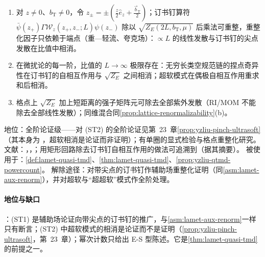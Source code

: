 \begin{assumption}\label{asm:lamet-staple}
\begin{enumerate}[label=(ST\arabic*),leftmargin=3.2em,itemsep=1pt,topsep=2pt]
\item 对 $z\neq0$、$b_{\mathrm T}\neq0$，令 $z_\pm=\pm(\frac z2\hat e_z+\frac{\vec b_{\mathrm T}}2)$；订书钉算符 $\bar\psi(z_+)\Gamma\mathcal W_z(z_+,z_-;L)\psi(z_-)$ 除以 $\sqrt{Z_E(2L,b_{\mathrm T},\mu)}$ 后乘法可重整，重整化因子只依赖于端点（重—轻流、夸克场）：$\propto L$ 的线性发散与订书钉的尖点发散在比值中相消。
\item 在微扰论的每一阶，比值的 $L\to\infty$ 极限存在：无穷长类空规范链的捏点奇异性在订书钉的自相互作用与 $\sqrt{Z_E}$ 之间相消；超软模式在偶极自相互作用重求和后相消。
\item 格点上 $\sqrt{Z_E}$ 加上短距离的强子矩阵元可除去全部紫外发散（RI/MOM 不能除去全部线性发散）；同维混合同\cref{prop:lattice-renormalizability}(b)。
\end{enumerate}
地位：全阶论证级——对 (ST2) 的全阶论证见第~23~章\cref{prop:yzliu-pinch-ultrasoft}（其本身为 \tagA，超软相消是论证而非证明）；有单圈的显式检验与格点重整化研究。
文献：\cite{Ji:2019ewn}，\cite[第~3--4~节]{Liu:2022nnk}，\cite{Ebert:2022fmh,Ebert:2019tvc,Constantinou:2019vyb,Alexandrou:2023ucc}；用矩形回路除去订书钉自相互作用的做法可追溯到\cite{Collins:2008ht,Ji:2018hvs}（据其摘要）。
被使用于：\cref{def:lamet-quasi-tmd}、\cref{thm:lamet-quasi-tmd}、\cref{prop:yzliu-qtmd-powercount}。
解除途径：对带尖点的订书钉作辅助场重整化证明（同\cref{asm:lamet-aux-renorm}），并对超软与“超超软”模式作全阶处理。
\end{assumption}

\paragraph{地位与缺口}
\tagA：(ST1) 是辅助场论证向带尖点的订书钉的推广，与\cref{asm:lamet-aux-renorm}一样只有断言；(ST2) 中超软模式的相消是论证而不是证明（\cref{prop:yzliu-pinch-ultrasoft}，第~23~章）；幂次计数只给出 E-S 型陈述。它是\cref{thm:lamet-quasi-tmd}的前提之一。

